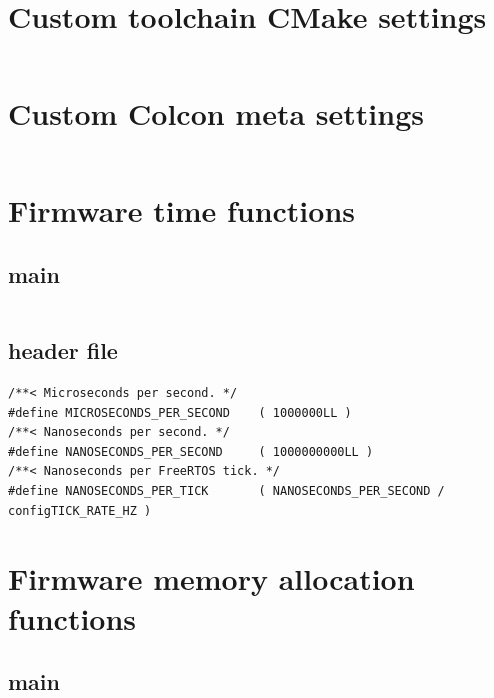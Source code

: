 \documentclass[10pt]{article}
\begin{document}
\pagebreak
\section{Custom toolchain CMake settings}
\label{sec:org018c1a0}
\inputminted[linenos, frame=single]{cmake}{./src/custom_r5f_toolchain.cmake}

\pagebreak
\section{Custom Colcon meta settings}
\label{sec:orgde2f14f}
\inputminted[linenos, frame=single]{yaml}{./src/custom_r5f_colcon.meta}

\pagebreak
\section{Firmware time functions}
\label{sec:orgeab8f33}

\subsection{main}
\label{sec:org499ec06}
\inputminted[linenos, frame=single]{c}{./src/clock.c}

\subsection{header file}
\label{sec:org29bb727}
\begin{verbatim}
/**< Microseconds per second. */
#define MICROSECONDS_PER_SECOND    ( 1000000LL )  
/**< Nanoseconds per second. */
#define NANOSECONDS_PER_SECOND     ( 1000000000LL ) 
/**< Nanoseconds per FreeRTOS tick. */  
#define NANOSECONDS_PER_TICK       ( NANOSECONDS_PER_SECOND / configTICK_RATE_HZ ) 
\end{verbatim}


\pagebreak
\section{Firmware memory allocation functions}
\label{sec:org5128799}

\subsection{main}
\label{sec:org63611b1}
\inputminted[linenos, frame=single]{c}{./src/allocators.c}
\end{document}
